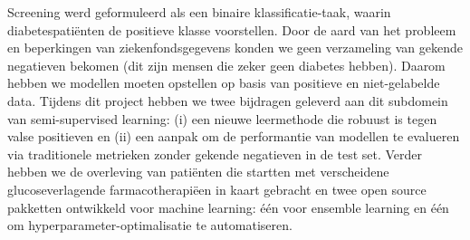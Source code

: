 
Screening werd geformuleerd als een binaire klassificatie-taak, waarin diabetespati\"enten de positieve klasse voorstellen. Door de aard van het probleem en beperkingen van ziekenfondsgegevens konden we geen verzameling van gekende negatieven bekomen (dit zijn mensen die zeker geen diabetes hebben). Daarom hebben we modellen moeten opstellen op basis van positieve en niet-gelabelde data. Tijdens dit project hebben we twee bijdragen geleverd aan dit subdomein van semi-supervised learning: (i) een nieuwe leermethode die robuust is tegen valse positieven en (ii) een aanpak om de performantie van modellen te evalueren via traditionele metrieken zonder gekende negatieven in de test set. Verder hebben we de overleving van pati\"enten die startten met verscheidene glucoseverlagende farmacotherapi\"een in kaart gebracht en twee open source pakketten ontwikkeld voor machine learning: \'e\'en voor ensemble learning en \'e\'en om hyperparameter-optimalisatie te automatiseren.


